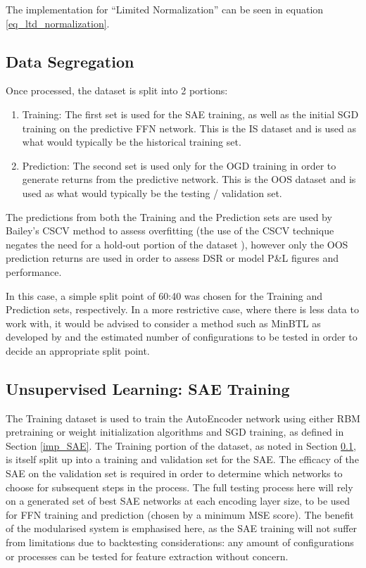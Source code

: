 \documentclass[a4paper,11pt,oneside]{article}
\theoremstyle{plain}
\theoremstyle{definition}
\begin{document}
	The implementation for ``Limited Normalization'' can be seen in equation \eqref{eq_ltd_normalization}.
	
	\subsection{Data Segregation}\label{proc_dataseg}
	
	Once processed, the dataset is split into 2 portions: 
	\begin{enumerate}
		\item Training: The first set is used for the SAE training, as well as the initial SGD training on the predictive FFN network. This is the IS dataset and is used as what would typically be the historical training set.
		\item Prediction: The second set is used only for the OGD training in order to generate returns from the predictive network. This is the OOS dataset and is used as what would typically be the testing / validation set.
	\end{enumerate}
	
	The predictions from both the Training and the Prediction sets are used by Bailey's CSCV method to assess overfitting (the use of the CSCV technique negates the need for a hold-out portion of the dataset \citep{BailyPBO}), however only the OOS prediction returns are used in order to assess DSR or model P\&L figures and performance. \newline
	
	In this case, a simple split point of 60:40 was chosen for the Training and Prediction sets, respectively. In a more restrictive case, where there is less data to work with, it would be advised to consider a method such as MinBTL as developed by \citet{BaileyBTL} and the estimated number of configurations to be tested in order to decide an appropriate split point.
	
	\subsection{Unsupervised Learning: SAE Training}\label{proc_sae}
	
	The Training dataset is used to train the AutoEncoder network using either RBM pretraining or weight initialization algorithms and SGD training, as defined in Section \ref{imp_SAE}. The Training portion of the dataset, as noted in Section \ref{proc_dataseg}, is itself split up into a training and validation set for the SAE. The efficacy of the SAE on the validation set is required in order to determine which networks to choose for subsequent steps in the process. The full testing process here will rely on a generated set of best SAE networks at each encoding layer size, to be used for FFN training and prediction (chosen by a minimum MSE score). The benefit of the modularised system is emphasised here, as the SAE training will not suffer from limitations due to backtesting considerations: any amount of configurations or processes can be tested for feature extraction without concern. \newline
	
\end{document}
